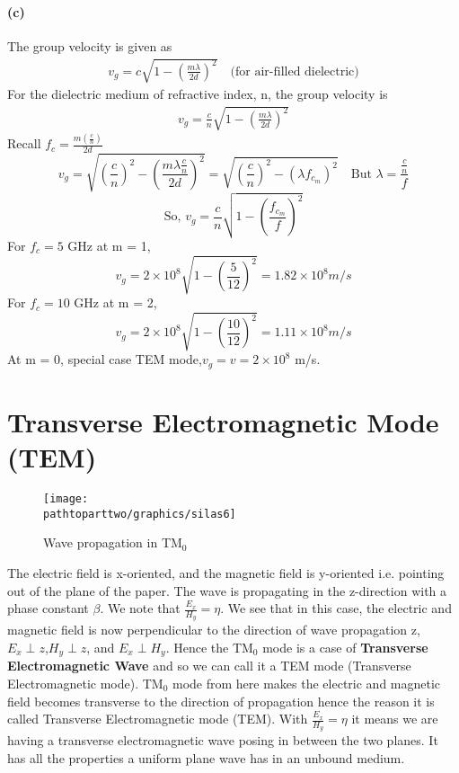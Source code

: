\begin{exmp}
\paragraph{(c)} The group velocity is given as
\begin{align*}
v_g = c\sqrt{1 - \left(\frac{m\lambda}{2d}\right)^2}\quad\text{(for air-filled dielectric)}
\end{align*}
For the dielectric medium of refractive index, n, the group velocity is
\begin{align*}
v_g = \frac{c}{n}\sqrt{1 - \left(\frac{m\lambda}{2d}\right)^2}
\end{align*}
Recall $f_c = \frac{m\left(\frac{c}{n}\right)}{2d}$
\begin{dmath*}
v_g = \sqrt{\left(\frac{c}{n}\right)^2 - \left(\frac{m\lambda\frac{c}{n}}{2d}\right)^2}
= \sqrt{\left(\frac{c}{n}\right)^2 - (\lambda f_{c_m})^2}\quad\text{But $\lambda = \frac{\frac{c}{n}}{f}$}
\end{dmath*}
\begin{dmath}
\text{So, }v_g = \frac{c}{n}\sqrt{1 - \left(\frac{f_{c_m}}{f}\right)^2}
\label{eqn:grpvel3}
\end{dmath}
For $f_c = 5$ GHz at m = 1,
\begin{dmath*}
v_g = 2\times10^8\sqrt{1 - \left(\frac{5}{12}\right)^2} = 1.82\times10^8 m/s
\end{dmath*}
For $f_{c} = 10$ GHz at m = 2,
\begin{dmath*}
v_g = 2\times10^8\sqrt{1 - \left(\frac{10}{12}\right)^2} = 1.11\times10^8 m/s
\end{dmath*}
At m = 0, special case TEM mode,$v_g = v = 2\times10^8$ m/s.
\end{exmp}

\section{Transverse Electromagnetic Mode (TEM)}
\begin{figure}[h]
\centering
\texttt{[image: \\pathtoparttwo/graphics/silas6]}
\caption{Wave propagation in TM$_0$}
\label{fig:silas6}
\end{figure}
The electric field is x-oriented, and the magnetic field is y-oriented i.e. pointing out of the plane of the paper. The wave is propagating in the z-direction with a phase constant $\beta$. We note that $\frac{E_{x}}{H_{y}} = \eta$. We see that in this case, the electric and magnetic field is now perpendicular to the direction of wave propagation z, $E_{x}\perp z$,$H_{y}\perp z$, and $E_{x}\perp H_{y}$. Hence the TM$_0$ mode is a case of \textbf{Transverse Electromagnetic Wave} and so we can call it a TEM mode (Transverse Electromagnetic mode). TM$_0$ mode from here makes the electric and magnetic field becomes transverse to the direction of propagation hence the reason it is called Transverse Electromagnetic mode (TEM). With $\frac{E_{x}}{H_{y}} = \eta$ it means we are having a transverse electromagnetic wave posing in between the two planes. It has all the properties a uniform plane wave has in an unbound medium.

